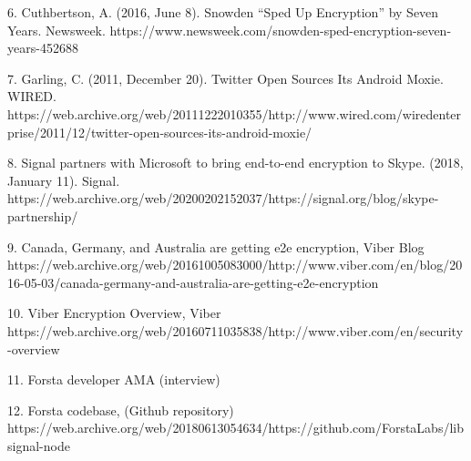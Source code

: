 \documentclass[12pt]{article}
\begin{document}
6. Cuthbertson, A. (2016, June 8). Snowden “Sped Up Encryption” by Seven Years. Newsweek. https://www.newsweek.com/snowden-sped-encryption-seven-years-452688

7. Garling, C. (2011, December 20). Twitter Open Sources Its Android Moxie. WIRED. https://web.archive.org/web/20111222010355/http://www.wired.com/wiredenterprise/2011/12/twitter-open-sources-its-android-moxie/

8. Signal partners with Microsoft to bring end-to-end encryption to Skype. (2018, January 11). Signal. https://web.archive.org/web/20200202152037/https://signal.org/blog/skype-partnership/

9. Canada, Germany, and Australia are getting e2e encryption, Viber Blog https://web.archive.org/web/20161005083000/http://www.viber.com/en/blog/2016-05-03/canada-germany-and-australia-are-getting-e2e-encryption

10. Viber Encryption Overview, Viber https://web.archive.org/web/20160711035838/http://www.viber.com/en/security-overview 

11. Forsta developer AMA (interview) %

12. Forsta codebase, (Github repository) https://web.archive.org/web/20180613054634/https://github.com/ForstaLabs/libsignal-node

\printbibliography
\end{document}
